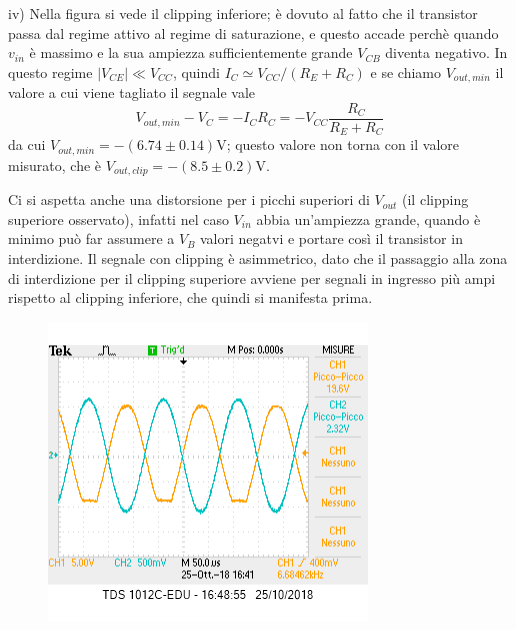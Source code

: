\documentclass[10pt,a4paper]{article}
\begin{document}
iv) Nella figura si vede il clipping inferiore; è dovuto al fatto che il transistor passa dal regime attivo al regime di saturazione, e questo accade perchè quando $v_{in}$ è massimo e la sua ampiezza sufficientemente grande $ V_{CB}$ diventa negativo.
In questo regime $|V_{CE}|\ll  V_{CC}$, quindi $ I_C \simeq V_{CC}/(R_E+R_C)$ e  se chiamo $V_{out,min}$ il valore a cui viene tagliato il segnale vale \[V_{out,min} -V_C= - I_C R_C = - V_{CC}\frac{R_C}{R_E+R_C}\]
da cui 
$V_{out,min} = -(6.74\pm 0.14) \si{\volt}$; questo valore non torna con il valore misurato, che è $V_{out,clip} = -(8.5\pm 0.2) \si{\volt}$.

Ci si aspetta anche una distorsione per i picchi superiori di $V_{out}$ (il clipping superiore osservato), infatti nel caso   $V_{in}$ abbia un'ampiezza grande, quando è minimo può far assumere a  $V_{B}$ valori negatvi e portare così il transistor in interdizione.
Il segnale con clipping è asimmetrico, dato che il passaggio alla zona di interdizione per il clipping superiore avviene per segnali in ingresso più ampi rispetto al clipping inferiore, che quindi si manifesta prima.

	\begin{figure}[h]
	\centering
	\includegraphics[scale=0.5]{clipping.png}
	\label{Clipping osservato (inferiore e superiore)}

	\end{figure}
\end{document}
